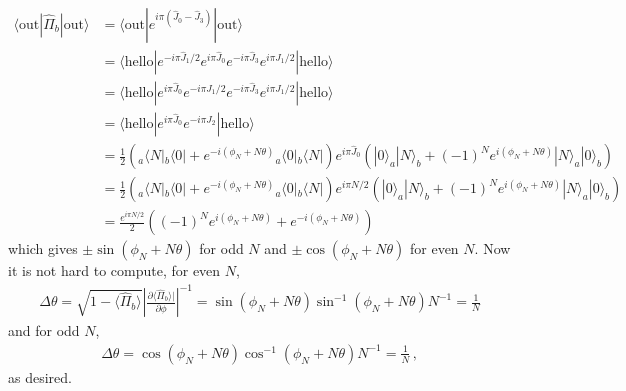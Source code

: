 \documentclass[11pt, oneside]{book}
\theoremstyle{break}
\theoremstyle{break}
\newcommand{\pd}{\partial}
\begin{document}
\begin{align*}
\langle \text{out}| \hat{\Pi}_b |\text{out}\rangle 
&= \langle \text{out}| e^{i\pi (\hat{J}_0 - \hat{J}_3)}|\text{out}\rangle\\
&= \langle \text{hello}|e^{-i \pi\hat{J}_1 /2} e^{i\pi\hat{J}_0 }e^{-i\pi \hat{J}_3} e^{i\pi\hat{J}_1/2} |\text{hello}\rangle\\
&= \langle \text{hello}| e^{i\pi\hat{J}_0 }
e^{-i \pi\hat{J}_1 /2}e^{-i\pi \hat{J}_3} e^{i\pi\hat{J}_1/2} |\text{hello}\rangle\\
&= \langle \text{hello}| e^{i\pi\hat{J}_0 }
e^{-i\pi\hat{J}_2} |\text{hello}\rangle\\
&=\frac{1}{2} \left({}_a\langle N|{}_b\langle 0| + e^{-i(\phi_N + N\theta)}{}_a\langle 0| {}_b\langle N| \right)  e^{i\pi \hat{J}_0}\left(|0\rangle_a|N\rangle_b+ (-1)^Ne^{i(\phi_N +N\theta)}|N\rangle_a | 0\rangle_b\right)\\
&=\frac{1}{2} \left({}_a\langle N|{}_b\langle 0| + e^{-i(\phi_N + N\theta)}{}_a\langle 0| {}_b\langle N| \right)  e^{i\pi N/2}\left(|0\rangle_a|N\rangle_b+ (-1)^Ne^{i(\phi_N +N\theta)}|N\rangle_a | 0\rangle_b\right)\\
&= \frac{e^{i\pi N/2}}{2}\left( (-1)^Ne^{i(\phi_N + N\theta)} + e^{-i(\phi_N + N\theta)}\right)
\end{align*}
which gives $\pm \sin(\phi_N + N\theta) $ for odd $N$ and $\pm\cos(\phi_N + N \theta)$ for even $N$. Now it is not hard to compute, for even $N$, 
\begin{align*}
\Delta \theta = \sqrt{1-\langle \hat{\Pi}_b\rangle}\left|\frac{\pd \langle \hat{\Pi}_b\rangle|}{\pd\phi}\right|^{-1} = \sin(\phi_N + N\theta) \sin^{-1}(\phi_N + N\theta) N^{-1}= \frac{1}{N}
\end{align*}
and for odd $N$, 
\begin{align*}
\Delta \theta = \cos(\phi_N + N \theta) \cos^{-1}(\phi_N +N\theta)N^{-1} = \frac{1}{N}\,,
\end{align*}
as desired. 
\end{document}
